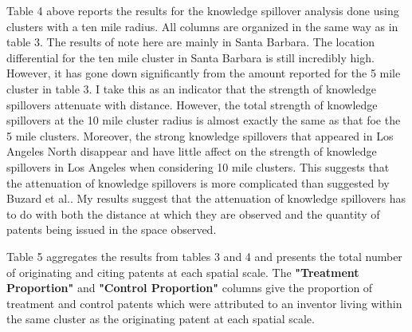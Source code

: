 \documentclass[12pt,letterpaper]{article}
\begin{document}
Table 4 above reports the results for the knowledge spillover analysis done using clusters with a ten mile radius. All columns are organized in the same way as in table 3. The results of note here are mainly in Santa Barbara. The location differential for the ten mile cluster in Santa Barbara is still incredibly high. However, it has gone down significantly from the amount reported for the 5 mile cluster in table 3. I take this as an indicator that the strength of knowledge spillovers attenuate with distance. However, the total strength of knowledge spillovers at the 10 mile cluster radius is almost exactly the same as that foe the 5 mile clusters. Moreover, the strong knowledge spillovers that appeared in Los Angeles North disappear and have little affect on the strength of knowledge spillovers in Los Angeles when considering 10 mile clusters. This suggests that the attenuation of knowledge spillovers is more complicated than suggested by Buzard et al.. My results suggest that the attenuation of knowledge spillovers has to do with both the distance at which they are observed and the quantity of patents being issued in the space observed. 
\begin{table}[H]
\centering
{}
\caption{}
\label{tab:my-table}
\end{table}
Table 5 aggregates the results from tables 3 and 4 and presents the total number of originating and citing patents at each spatial scale. The \textbf{"Treatment Proportion"} and \textbf{"Control Proportion"} columns give the proportion of treatment and control patents which were attributed to an inventor living within the same cluster as the originating patent at each spatial scale. 
\end{document}
